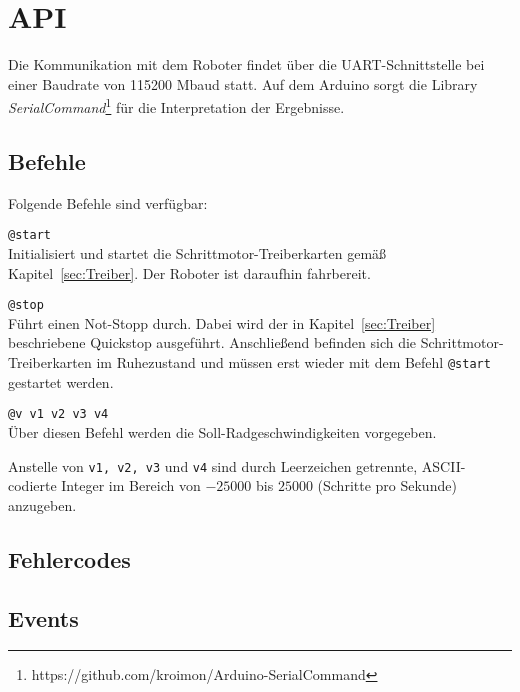 
\section{API}
Die Kommunikation mit dem Roboter findet über die UART-Schnittstelle bei einer Baudrate von 115200 Mbaud statt.
Auf dem Arduino sorgt die Library \emph{SerialCommand}\footnote{https://github.com/kroimon/Arduino-SerialCommand} für die Interpretation der Ergebnisse.

\subsection{Befehle}
Folgende Befehle sind verfügbar:
\begin{description}
\item \lstinline{@start} \\
Initialisiert und startet die Schrittmotor-Treiberkarten gemäß Kapitel~\ref{sec:Treiber}.
Der Roboter ist daraufhin fahrbereit.

\item \lstinline{@stop} \\
Führt einen Not-Stopp durch. Dabei wird der in Kapitel~\ref{sec:Treiber} beschriebene Quickstop ausgeführt.
Anschließend befinden sich die Schrittmotor-Treiberkarten im Ruhezustand und müssen erst wieder mit dem Befehl \lstinline{@start} gestartet werden.

\item \lstinline{@v v1 v2 v3 v4} \\
Über diesen Befehl werden die Soll-Radgeschwindigkeiten vorgegeben.

Anstelle von \lstinline{v1, v2, v3} und \lstinline{v4} sind durch Leerzeichen getrennte, ASCII-codierte Integer im Bereich von $-25000$ bis $25000$ (Schritte pro Sekunde) anzugeben.
\end{description}

\subsection{Fehlercodes}

\subsection{Events}
